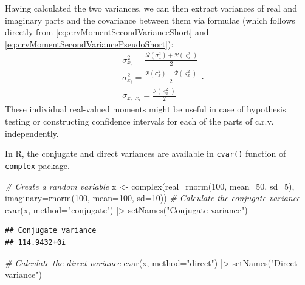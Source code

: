 \documentclass[
]{book}
\newenvironment{Shaded}{\begin{snugshade}}{\end{snugshade}}
\newcommand{\AttributeTok}[1]{\textcolor[rgb]{0.77,0.63,0.00}{#1}}
\newcommand{\CommentTok}[1]{\textcolor[rgb]{0.56,0.35,0.01}{\textit{#1}}}
\newcommand{\DecValTok}[1]{\textcolor[rgb]{0.00,0.00,0.81}{#1}}
\newcommand{\FunctionTok}[1]{\textcolor[rgb]{0.00,0.00,0.00}{#1}}
\newcommand{\NormalTok}[1]{#1}
\newcommand{\OtherTok}[1]{\textcolor[rgb]{0.56,0.35,0.01}{#1}}
\newcommand{\SpecialCharTok}[1]{\textcolor[rgb]{0.00,0.00,0.00}{#1}}
\newcommand{\StringTok}[1]{\textcolor[rgb]{0.31,0.60,0.02}{#1}}
\begin{document}
Having calculated the two variances, we can then extract variances of real and imaginary parts and the covariance between them via formulae (which follows directly from \eqref{eq:crvMomentSecondVarianceShort} and \eqref{eq:crvMomentSecondVariancePseudoShort}):
\begin{equation}
    \begin{aligned}
        & \sigma_{x_r}^2 = \frac{\mathcal{R}(\sigma^2_x) + \mathcal{R}(\varsigma^2_x)}{2} \\
        & \sigma_{x_i}^2 = \frac{\mathcal{R}(\sigma^2_x) - \mathcal{R}(\varsigma^2_x)}{2} \\
        & \sigma_{x_r,x_i} = \frac{\mathcal{I}(\varsigma^2_x)}{2}
    \end{aligned} .
    \label{eq:IndividualVariances}
\end{equation}
These individual real-valued moments might be useful in case of hypothesis testing or constructing confidence intervals for each of the parts of c.r.v. independently.

In R, the conjugate and direct variances are available in \texttt{cvar()} function of \texttt{complex} package.

\begin{Shaded}
\begin{Highlighting}[]
\CommentTok{\# Create a random variable}
\NormalTok{x }\OtherTok{\textless{}{-}} \FunctionTok{complex}\NormalTok{(}\AttributeTok{real=}\FunctionTok{rnorm}\NormalTok{(}\DecValTok{100}\NormalTok{, }\AttributeTok{mean=}\DecValTok{50}\NormalTok{, }\AttributeTok{sd=}\DecValTok{5}\NormalTok{),}
             \AttributeTok{imaginary=}\FunctionTok{rnorm}\NormalTok{(}\DecValTok{100}\NormalTok{, }\AttributeTok{mean=}\DecValTok{100}\NormalTok{, }\AttributeTok{sd=}\DecValTok{10}\NormalTok{))}
\CommentTok{\# Calculate the conjugate variance}
\FunctionTok{cvar}\NormalTok{(x, }\AttributeTok{method=}\StringTok{"conjugate"}\NormalTok{) }\SpecialCharTok{|\textgreater{}}
    \FunctionTok{setNames}\NormalTok{(}\StringTok{"Conjugate variance"}\NormalTok{)}
\end{Highlighting}
\end{Shaded}

\begin{verbatim}
## Conjugate variance 
## 114.9432+0i
\end{verbatim}

\begin{Shaded}
\begin{Highlighting}[]
\CommentTok{\# Calculate the direct variance}
\FunctionTok{cvar}\NormalTok{(x, }\AttributeTok{method=}\StringTok{"direct"}\NormalTok{) }\SpecialCharTok{|\textgreater{}}
    \FunctionTok{setNames}\NormalTok{(}\StringTok{"Direct variance"}\NormalTok{)}
\end{Highlighting}
\end{Shaded}
\end{document}
